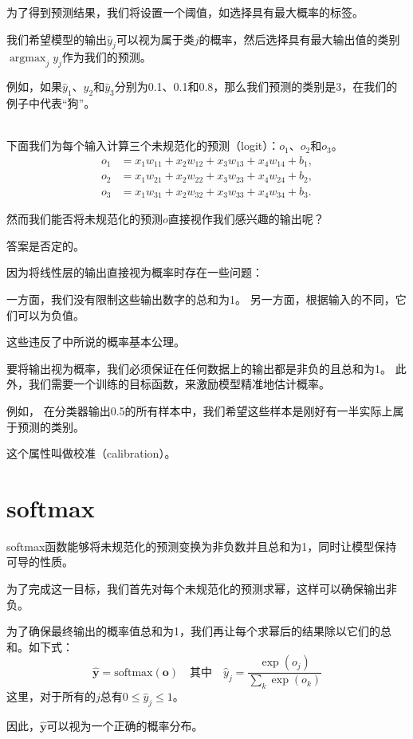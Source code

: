 \documentclass[openany,11pt]{book}
\begin{document}
为了得到预测结果，我们将设置一个阈值，如选择具有最大概率的标签。

我们希望模型的输出$\hat{y}_j$可以视为属于类$j$的概率，然后选择具有最大输出值的类别$\operatorname{argmax}_j y_j$作为我们的预测。

例如，如果$\hat{y}_1$、$\hat{y}_2$和$\hat{y}_3$分别为0.1、0.1和0.8，那么我们预测的类别是3，在我们的例子中代表“狗”。


~\\
下面我们为每个输入计算三个未规范化的预测（logit）：$o_1$、$o_2$和$o_3$。
$$
\begin{aligned}
	o_1 &= x_1 w_{11} + x_2 w_{12} + x_3 w_{13} + x_4 w_{14} + b_1,\\
	o_2 &= x_1 w_{21} + x_2 w_{22} + x_3 w_{23} + x_4 w_{24} + b_2,\\
	o_3 &= x_1 w_{31} + x_2 w_{32} + x_3 w_{33} + x_4 w_{34} + b_3.
\end{aligned}
$$

然而我们能否将未规范化的预测$o$直接视作我们感兴趣的输出呢？

答案是否定的。

因为将线性层的输出直接视为概率时存在一些问题：

一方面，我们没有限制这些输出数字的总和为1。
另一方面，根据输入的不同，它们可以为负值。

这些违反了中所说的概率基本公理。

要将输出视为概率，我们必须保证在任何数据上的输出都是非负的且总和为1。
此外，我们需要一个训练的目标函数，来激励模型精准地估计概率。

例如，
在分类器输出0.5的所有样本中，我们希望这些样本是刚好有一半实际上属于预测的类别。

这个属性叫做校准（calibration）。


\chapter{softmax}

softmax函数能够将未规范化的预测变换为非负数并且总和为1，同时让模型保持
可导的性质。

为了完成这一目标，我们首先对每个未规范化的预测求幂，这样可以确保输出非负。

为了确保最终输出的概率值总和为1，我们再让每个求幂后的结果除以它们的总和。如下式：
$$\hat{\mathbf{y}} = \mathrm{softmax}(\mathbf{o})\quad \text{其中}\quad \hat{y}_j = \frac{\exp(o_j)}{\sum_k \exp(o_k)}$$
这里，对于所有的$j$总有$0 \leq \hat{y}_j \leq 1$。

因此，$\hat{\mathbf{y}}$可以视为一个正确的概率分布。
\end{document}
